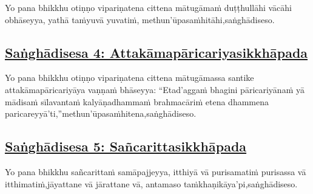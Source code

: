 Yo pana bhikkhu otiṇṇo vipariṇatena cittena mātugāmaṁ duṭṭhullāhi vācāhi obhāseyya, yathā taṁ\makeatletter\hyperlink{endnote41-appendix}\makeatother \thinspace yuvā yuvatiṁ, methun'ūpasaṁhitāhi,\makeatletter\hyperlink{endnote42-appendix}\makeatother \thinspace saṅghādiseso.



\subsection*{\hyperref[comm4]{Saṅghādisesa 4: Attakāmapāricariyasikkhāpada}}
\label{sd4}

Yo pana bhikkhu otiṇṇo vipariṇatena cittena mātugāmassa santike attakāmapāricariyāya vaṇṇaṁ bhāseyya: ``Etad'aggaṁ bhagini pāricariyānaṁ yā mādisaṁ sīlavantaṁ kalyāṇadhammaṁ brahmacāriṁ etena dhammena paricareyyā'ti,''\makeatletter\hyperlink{endnote-appendix}\makeatother \thinspace methun'ūpasaṁhitena,\makeatletter\hyperlink{endnote-appendix}\makeatother \thinspace saṅghādiseso.



\subsection*{\hyperref[comm5]{Saṅghādisesa 5: Sañcarittasikkhāpada}}
\label{sd5}

Yo pana bhikkhu sañcarittaṁ samāpajjeyya, itthiyā vā purisamatiṁ purisassa vā itthimatiṁ,\makeatletter\hyperlink{endnote45-appendix}\makeatother \thinspace jāyattane vā jārattane vā, antamaso taṁkhaṇikāya'pi,\makeatletter\hyperlink{endnote46-appendix}\makeatother \thinspace saṅghādiseso.



